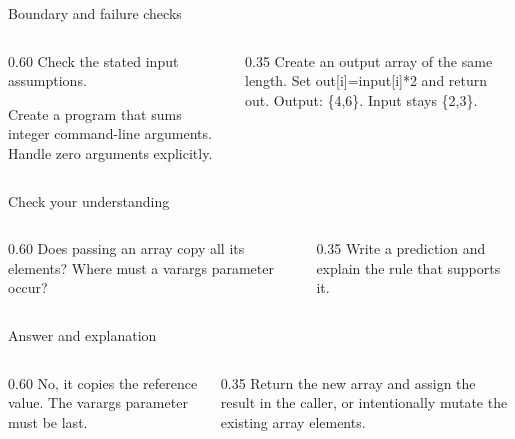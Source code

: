\documentclass[10pt,aspectratio=169]{beamer}
\begin{document}
\begin{frame}[fragile,t]{Boundary and failure checks}
\begin{columns}[T,onlytextwidth]\begin{column}{0.60\textwidth}
Check the stated input assumptions.

Create a program that sums integer command-line arguments. Handle zero arguments explicitly.
\end{column}\begin{column}{0.35\textwidth}\small
Create an output array of the same length. Set out[i]=input[i]*2 and return out. Output: \{4,6\}. Input stays \{2,3\}.
\end{column}\end{columns}
\end{frame}

\begin{frame}[fragile,t]{Check your understanding}
\begin{columns}[T,onlytextwidth]\begin{column}{0.60\textwidth}
Does passing an array copy all its elements? Where must a varargs parameter occur?
\end{column}\begin{column}{0.35\textwidth}\small
Write a prediction and explain the rule that supports it.
\end{column}\end{columns}
\end{frame}

\begin{frame}[fragile,t]{Answer and explanation}
\begin{columns}[T,onlytextwidth]\begin{column}{0.60\textwidth}
No, it copies the reference value. The varargs parameter must be last.
\end{column}\begin{column}{0.35\textwidth}\small
Return the new array and assign the result in the caller, or intentionally mutate the existing array elements.
\end{column}\end{columns}
\end{frame}
\end{document}

